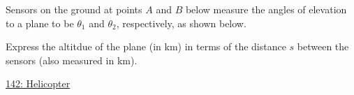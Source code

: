 \documentclass{ximera}
\begin{document}
\begin{question} \label{QddtgHHERER}
Sensors on the ground at points $A$ and $B$ below measure the angles of elevation to a plane to be $\theta_1$ and $\theta_2$, respectively, as shown below.

Express the altitdue of the plane (in km) in terms of the distance $s$ between the sensors (also measured in km).

\begin{onlineOnly}
    \begin{center}
\end{center}
\end{onlineOnly}

\href{https://www.desmos.com/calculator/zbktegkke4}{142: Helicopter}




\end{question}
\end{document}
